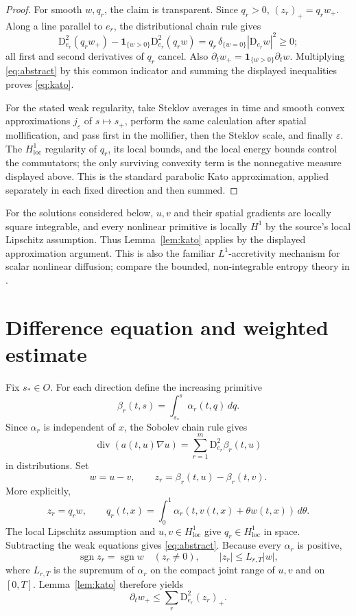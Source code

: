 \documentclass[11pt]{article}
\newcommand{\D}{\mathrm D}
\begin{document}
\begin{proof}
For smooth $w,q_r$, the claim is transparent. Since $q_r>0$,
$(z_r)_+=q_rw_+$. Along a line parallel to $e_r$, the distributional chain
rule gives
\[
 \D_{e_r}^2(q_rw_+)
 -\mathbf1_{\{w>0\}}\D_{e_r}^2(q_rw)
 =q_r\,\delta_{\{w=0\}}|\D_{e_r}w|^2\geq0;
\]
all first and second derivatives of $q_r$ cancel. Also
$\partial_tw_+=\mathbf1_{\{w>0\}}\partial_tw$. Multiplying
\eqref{eq:abstract} by this common indicator and summing the displayed
inequalities proves \eqref{eq:kato}.

For the stated weak regularity, take Steklov averages in time and smooth
convex approximations $j_\varepsilon$ of $s\mapsto s_+$, perform the same
calculation after spatial mollification, and pass first in the mollifier,
then the Steklov scale, and finally $\varepsilon$. The
$H^1_{\mathrm{loc}}$ regularity of $q_r$, its local bounds, and the local
energy bounds control the commutators; the only surviving convexity term is
the nonnegative measure displayed above. This is the standard parabolic Kato
approximation, applied separately in each fixed direction and then summed.
\end{proof}

For the solutions considered below, $u,v$ and their spatial gradients are
locally square integrable, and every nonlinear primitive is locally
$H^1$ by the source's local Lipschitz assumption.  Thus Lemma~\ref{lem:kato}
applies by the displayed approximation argument.  This is also the familiar
$L^1$-accretivity mechanism for scalar nonlinear diffusion; compare the
bounded, non-integrable entropy theory in \cite{EJ}.

\section{Difference equation and weighted estimate}

Fix $s_*\in O$.  For each direction define the increasing primitive
\begin{equation}\label{eq:beta}
 \beta_r(t,s)=\int_{s_*}^s\alpha_r(t,q)\,dq.
\end{equation}
Since $\alpha_r$ is independent of $x$, the Sobolev chain rule gives
\[
 \operatorname{div}(a(t,u)\nabla u)
 =\sum_{r=1}^m\D_{e_r}^2\beta_r(t,u)
\]
in distributions.  Set
\[
 w=u-v,
 \qquad z_r=\beta_r(t,u)-\beta_r(t,v).
\]
More explicitly,
\[
 z_r=q_rw,\qquad
 q_r(t,x)=\int_0^1\alpha_r(t,v(t,x)+\theta w(t,x))\,d\theta.
\]
The local Lipschitz assumption and $u,v\in H^1_{\mathrm{loc}}$ give
$q_r\in H^1_{\mathrm{loc}}$ in space.
Subtracting the weak equations gives \eqref{eq:abstract}. Because every
$\alpha_r$ is positive,
\begin{equation}\label{eq:signbound}
 \operatorname{sgn}z_r=\operatorname{sgn}w\quad(z_r\ne0),
 \qquad |z_r|\leq L_{r,T}|w|,
\end{equation}
where $L_{r,T}$ is the supremum of $\alpha_r$ on the compact joint range
of $u,v$ and on $[0,T]$.  Lemma~\ref{lem:kato} therefore yields
\begin{equation}\label{eq:kato2}
 \partial_tw_+\leq\sum_r\D_{e_r}^2(z_r)_+.
\end{equation}
\end{document}
